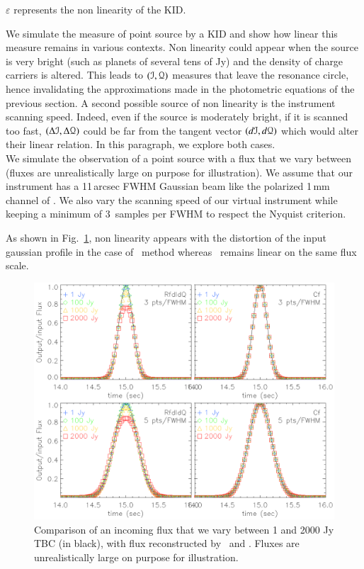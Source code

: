 {$\varepsilon$ represents the non linearity of the KID.


We simulate
the measure of point source by a KID and show how linear this measure remains in
various contexts. Non linearity could appear when the source is very bright
(such as planets of several tens of Jy) and the density of charge carriers is
altered. This leads to $(\mathcal{I},\mathcal{Q})$ measures that leave the resonance circle, hence
invalidating the approximations made in the photometric equations of the
previous section. A second possible source of non linearity is the instrument
scanning speed. Indeed, even if the source is moderately bright, if it is
scanned too fast, $(\Delta\mathcal{I},\Delta\mathcal{Q})$ could be far from the tangent vector
$(d\mathcal{I},d\mathcal{Q})$ which would alter their linear relation. In this paragraph, we
explore both cases.\\

We simulate the observation of a point source with a flux
that we vary between  (fluxes are unrealistically large on purpose for illustration). We assume that our instrument has
a 11\,arcsec FWHM Gaussian beam like the polarized 1\,mm channel of \nikad. We
also vary the scanning speed of our virtual instrument while keeping a minimum
of 3~samples per FWHM to respect the Nyquist criterion.}
As shown in Fig.~\ref{fig:planet_profiles}, non linearity appears with the distortion of the input gaussian profile in the case of \rf\ method whereas \cf\ remains linear on the same flux scale.

\begin{figure}
  \includegraphics[clip, angle=0, width=\columnwidth]{../Figures/planet_profiles.eps}
  \caption{Comparison of an incoming flux that we vary between 1 and 2000 Jy TBC (in black), with flux reconstructed by \rf\ and \cf. Fluxes are unrealistically large on purpose for illustration. }
  \label{fig:planet_profiles}
\end{figure}
